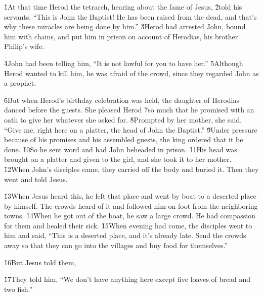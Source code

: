 \v{1}At that time Herod the tetrarch, hearing about the fame of Jesus, \v{2}told his servants, ``This is John the Baptist! He has been raised from the dead, and that's why these miracles are being done by him.'' \v{3}Herod had arrested John, bound him with chains, and put him in prison on account of Herodias, his brother Philip's wife.

\v{4}John had been telling him, ``It is not lawful for you to have her.'' \v{5}Although Herod wanted to kill him, he was afraid of the crowd, since they regarded John as a prophet.

\v{6}But when Herod's birthday celebration was held, the daughter of Herodias danced before the guests. She pleased Herod \v{7}so much that he promised with an oath to give her whatever she asked for. \v{8}Prompted by her mother, she said, ``Give me, right here on a platter, the head of John the Baptist.'' \v{9}Under pressure because of his promises and his assembled guests, the king ordered that it be done. \v{10}So he sent word and had John beheaded in prison. \v{11}His head was brought on a platter and given to the girl, and she took it to her mother. \v{12}When John's disciples came, they carried off the body and buried it. Then they went and told Jesus.

\v{13}When Jesus heard this, he left that place and went by boat to a deserted place by himself. The crowds heard of it and followed him on foot from the neighboring towns. \v{14}When he got out of the boat, he saw a large crowd. He had compassion for them and healed their sick. \v{15}When evening had come, the disciples went to him and said, ``This is a deserted place, and it's already late. Send the crowds away so that they can go into the villages and buy food for themselves.''

\v{16}But Jesus told them, 

\v{17}They told him, ``We don't have anything here except five loaves of bread and two fish.''

